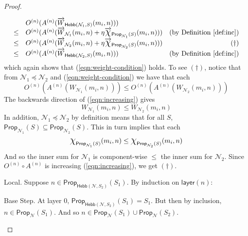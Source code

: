 \documentclass[letterpaper]{article}
\theoremstyle{definition}
\newcommand*{\bigchi}{\mbox{\Large$\chi$}}%
\newcommand{\layer}[1]{\mathsf{layer}(#1)}
\newcommand{\Prop}{\textsf{Prop}}
\newcommand{\Hebb}{\textsf{Hebb}}
\newcommand{\Net}{\mathcal{N}}
\begin{document}
\begin{proof}
\begin{compactdesc}
\[\begin{array}{llr}
    &
    O^{(n)}(A^{(n)}(\overrightarrow{W}_{\Hebb(\Net_1, S)}(m_i, n))) & 
    \\
    
    \leq &
    O^{(n)}(A^{(n)}(\overrightarrow{W}_{\Net_1}(m_i, n) + \eta \overrightarrow{\bigchi}_{\Prop_{\Net_1}(S)}(m_i, n))) & 
    \mbox{(by Definition~\ref{def:inc})}\\
    
    \leq &
    O^{(n)}(A^{(n)}(\overrightarrow{W}_{\Net_2}(m_i, n) + \eta \overrightarrow{\bigchi}_{\Prop_{\Net_2}(S)}(m_i, n))) & 
    (\dagger)\\
    
    \leq &
    O^{(n)}(A^{(n)}(\overrightarrow{W}_{\Hebb(\Net_2, S)}(m_i, n))) & 
    \mbox{(by Definition~\ref{def:inc})}
    \end{array}
    \]
    which again shows that (\ref{eqn:weight-condition}) holds.  To see $(\dagger)$, notice that from $\Net_1 \preceq \Net_2$ and (\ref{eqn:weight-condition}) we have that each
    \[
    O^{(n)}(A^{(n)}(W_{\Net_1}(m_i, n))) \leq O^{(n)}(A^{(n)}(W_{\Net_2}(m_i, n)))
    \]
    The backwards direction of (\ref{eqn:increasing}) gives
    \[
    W_{\Net_1}(m_i, n) \leq W_{\Net_2}(m_i, n)
    \]
    In addition, $\Net_1 \preceq \Net_2$ by definition means that for all $S$, $\Prop_{\Net_1}(S) \subseteq \Prop_{\Net_2}(S)$.  This in turn implies that each
    \[
    \bigchi_{\Prop_{\Net_1}(S)}(m_i, n) \leq \bigchi_{\Prop_{\Net_2}(S)}(m_i, n)
    \]
    And so the inner sum for $\Net_1$ is component-wise $\leq$ the inner sum for $\Net_2$.  Since ${O^{(n)} \circ A^{(n)}}$ is increasing (\ref{eqn:increasing}), we get $(\dagger)$.
    
    \item[Local.]
    Suppose $n \in \Prop_{\Hebb(\Net, S_2)}(S_1)$.  By induction on $\layer{n}$:
    \begin{compactdesc}
        \item[Base Step.] At layer $0$, $\Prop_{\Hebb(\Net, S_2)}(S_1) = S_1$.  But then by inclusion, $n \in \Prop_{\Net}(S_1)$. And so $n \in \Prop_{\Net}(S_1) \cup \Prop_{\Net}(S_2)$.
        

\end{compactdesc}
\end{compactdesc}
\end{proof}
\end{document}
